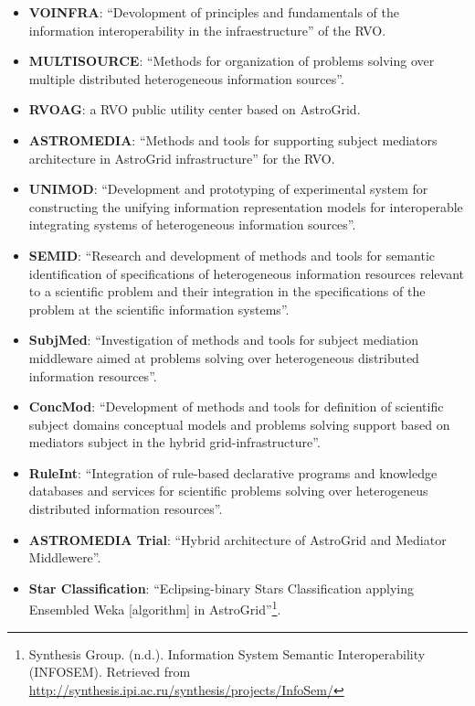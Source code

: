 \begin{itemize}
\item \textbf{VOINFRA}:
``Devolopment of principles and fundamentals of the information interoperability
in the infraestructure'' of the RVO.

\item \textbf{MULTISOURCE}:
``Methods for organization of problems solving over multiple distributed
heterogeneous information sources''.

\item \textbf{RVOAG}:
a RVO public utility center based on AstroGrid.

\item \textbf{ASTROMEDIA}:
``Methods and tools for supporting subject mediators architecture in AstroGrid
infrastructure'' for the RVO.

\item \textbf{UNIMOD}:
``Development and prototyping of experimental system for constructing the
unifying information representation models for interoperable integrating systems
of heterogeneous information sources''.

\item \textbf{SEMID}:
``Research and development of methods and tools for semantic identification of
specifications of heterogeneous information resources relevant to a scientific
problem and their integration in the specifications of the problem at the
scientific information systems''.

\item \textbf{SubjMed}:
``Investigation of methods and tools for subject mediation middleware aimed at
problems solving over heterogeneous distributed information resources''.

\item \textbf{ConcMod}:
``Development of methods and tools for definition of scientific subject domains
conceptual models and problems solving support based on mediators subject in the
hybrid grid-infrastructure''.

\item \textbf{RuleInt}:
``Integration of rule-based declarative programs and knowledge databases and
services for scientific problems solving over heterogeneus distributed
information resources''.

\item \textbf{ASTROMEDIA Trial}:
``Hybrid architecture of AstroGrid and Mediator Middlewere''.

\item \textbf{Star Classification}:
``Eclipsing-binary Stars Classification applying Ensembled Weka [algorithm] in
AstroGrid''\footnote{Synthesis Group. (n.d.). Information System Semantic
Interoperability (INFOSEM). Retrieved from
\url{http://synthesis.ipi.ac.ru/synthesis/projects/InfoSem/}}.

\end{itemize}

